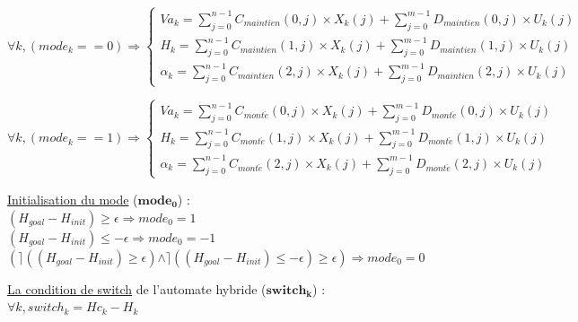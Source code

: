 	\[\forall k, (mode_k == 0) \Rightarrow 
	\left \{
	\begin{array}{l}
	Va_k = \sum_{j=0}^{n-1} C_{maintien}(0,j)\times X_k(j) + \sum_{j=0}^{m-1} D_{maintien}(0,j)\times U_k(j) \\
	H_k = \sum_{j=0}^{n-1} C_{maintien}(1,j)\times X_k(j) + \sum_{j=0}^{m-1} D_{maintien}(1,j)\times U_k(j) \\
	\alpha_k = \sum_{j=0}^{n-1} C_{maintien}(2,j)\times X_k(j) + \sum_{j=0}^{m-1} D_{maintien}(2,j)\times U_k(j)
	\end{array}
	\right.\]
	
	\[\forall k, (mode_k == 1) \Rightarrow 
	\left \{
	\begin{array}{l}
	Va_k = \sum_{j=0}^{n-1} C_{mont\acute{e}}(0,j)\times X_k(j) + \sum_{j=0}^{m-1} D_{mont\acute{e}}(0,j)\times U_k(j) \\
	H_k = \sum_{j=0}^{n-1} C_{mont\acute{e}}(1,j)\times X_k(j) + \sum_{j=0}^{m-1} D_{mont\acute{e}}(1,j)\times U_k(j) \\
	\alpha_k = \sum_{j=0}^{n-1} C_{mont\acute{e}}(2,j)\times X_k(j) + \sum_{j=0}^{m-1} D_{mont\acute{e}}(2,j)\times U_k(j)
	\end{array}
	\right.\]	
	
	\underline{Initialisation du mode} ($\mathbf{mode_0}$) :\\
	$(H_{goal} - H_{init}) \geq \epsilon \Rightarrow mode_0 = 1$ \\
	$(H_{goal} - H_{init}) \leq -\epsilon \Rightarrow mode_0 = -1$ \\
	$(\rceil((H_{goal} - H_{init}) \geq \epsilon) \wedge \rceil((H_{goal} - H_{init}) \leq -\epsilon) \geq \epsilon) \Rightarrow mode_0 = 0$ 
			
	\underline{La condition de switch} de l'automate hybride ($\mathbf{switch_k}$) :\\
	$\forall k, switch_k = Hc_k - H_k$
	
